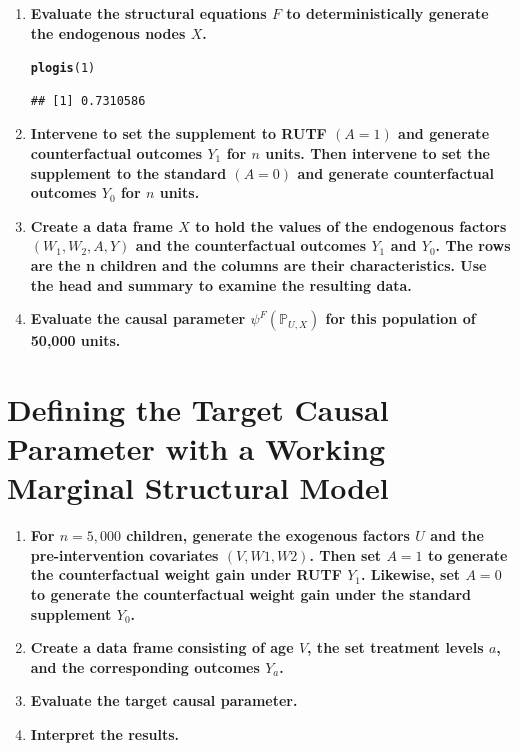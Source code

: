 \documentclass{article}\usepackage[]{graphicx}\usepackage[]{xcolor}
\makeatletter
\newcommand{\hlnum}[1]{\textcolor[rgb]{0.686,0.059,0.569}{#1}}%
\newcommand{\hlstd}[1]{\textcolor[rgb]{0.345,0.345,0.345}{#1}}%
\newcommand{\hlkwd}[1]{\textcolor[rgb]{0.737,0.353,0.396}{\textbf{#1}}}%
\newenvironment{kframe}{%
 \def\at@end@of@kframe{}%
 \ifinner\ifhmode%
  \def\at@end@of@kframe{\end{minipage}}%
  \begin{minipage}{\columnwidth}%
 \fi\fi%
 \def\FrameCommand##1{\hskip\@totalleftmargin \hskip-\fboxsep
 \colorbox{shadecolor}{##1}\hskip-\fboxsep
     \hskip-\linewidth \hskip-\@totalleftmargin \hskip\columnwidth}%
 \MakeFramed {\advance\hsize-\width
   \@totalleftmargin\z@ \linewidth\hsize
   \@setminipage}}%
 {\par\unskip\endMakeFramed%
 \at@end@of@kframe}
\newenvironment{knitrout}{}{} %
\makeatother
\begin{document}
\begin{enumerate}[label=\textbf{\arabic*.}]
      \item \textbf{Evaluate the structural equations $F$ to deterministically generate the endogenous nodes $X$.}
      
\begin{knitrout}
\color{fgcolor}\begin{kframe}
\begin{alltt}
\hlkwd{plogis}\hlstd{(}\hlnum{1}\hlstd{)}
\end{alltt}
\begin{verbatim}
## [1] 0.7310586
\end{verbatim}
\end{kframe}
\end{knitrout}
      
      \item \textbf{Intervene to set the supplement to RUTF $(A = 1)$ and generate counterfactual outcomes $Y_1$ for $n$ units. Then intervene to set the supplement to the standard $(A = 0)$ and generate counterfactual outcomes $Y_0$ for $n$ units.}
      
      \item \textbf{Create a data frame $X$ to hold the values of the endogenous factors $(W_1, W_2, A, Y)$ and the counterfactual outcomes $Y_1$ and $Y_0$. The rows are the n children and the columns are their characteristics. Use the head and summary to examine the resulting data.}
      
      \item \textbf{Evaluate the causal parameter $\psi^F(\mathbb{P}_{U,X})$ for this population of 50,000 units.}
  
    \end{enumerate}

\pagebreak
  
\section{Defining the Target Causal Parameter with a Working Marginal Structural Model}

\begin{enumerate}[label=\textbf{\arabic*.}]

  \item \textbf{For $n = 5,000$ children, generate the exogenous factors $U$ and the pre-intervention covariates $(V, W1, W2)$. Then set $A = 1$ to generate the counterfactual weight gain under RUTF $Y_1$. Likewise, set $A = 0$ to generate the counterfactual weight gain under the standard supplement $Y_0$.}
  
  \item \textbf{Create a data frame}  \textbf{consisting of age $V$, the set treatment levels $a$, and the corresponding outcomes $Y_a$.}
  
  \item \textbf{Evaluate the target causal parameter.}
  
  \item \textbf{Interpret the results.}

\end{enumerate}
      
\end{document}
